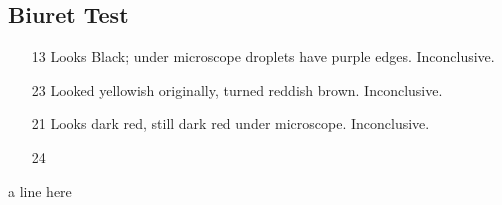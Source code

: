 \documentclass[12pt,a4paper]{article}
\begin{document}
\subsection{Biuret Test}
\begin{itemize}
\item[13]  Looks Black; under microscope droplets have purple edges. Inconclusive.
\item[23] Looked yellowish originally, turned reddish brown. Inconclusive.
\item[21]  Looks dark red, still dark red under microscope. Inconclusive.
\item[24]
\end{itemize}
a line here
\end{document}
